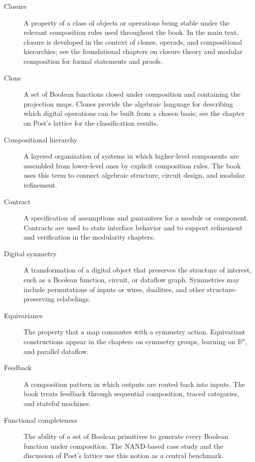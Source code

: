 \begin{description}
  \item[Closure] A property of a class of objects or operations being stable under the relevant composition rules used throughout the book. In the main text, closure is developed in the context of clones, operads, and compositional hierarchies; see the foundational chapters on closure theory and modular composition for formal statements and proofs.

  \item[Clone] A set of Boolean functions closed under composition and containing the projection maps. Clones provide the algebraic language for describing which digital operations can be built from a chosen basis; see the chapter on Post's lattice for the classification results.

  \item[Compositional hierarchy] A layered organization of systems in which higher-level components are assembled from lower-level ones by explicit composition rules. The book uses this term to connect algebraic structure, circuit design, and modular refinement.

  \item[Contract] A specification of assumptions and guarantees for a module or component. Contracts are used to state interface behavior and to support refinement and verification in the modularity chapters.

  \item[Digital symmetry] A transformation of a digital object that preserves the structure of interest, such as a Boolean function, circuit, or dataflow graph. Symmetries may include permutations of inputs or wires, dualities, and other structure-preserving relabelings.

  \item[Equivariance] The property that a map commutes with a symmetry action. Equivariant constructions appear in the chapters on symmetry groups, learning on \(\mathbb{B}^n\), and parallel dataflow.

  \item[Feedback] A composition pattern in which outputs are routed back into inputs. The book treats feedback through sequential composition, traced categories, and stateful machines.

  \item[Functional completeness] The ability of a set of Boolean primitives to generate every Boolean function under composition. The NAND-based case study and the discussion of Post's lattice use this notion as a central benchmark.


\end{description}
